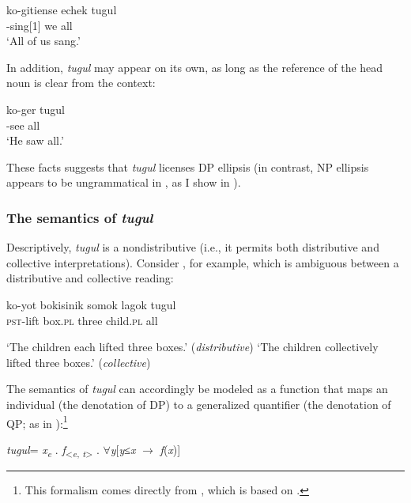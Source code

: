 \documentclass[output=paper,newtxmath,modfonts,nonflat,hidelinks]{langsci/langscibook}
\begin{document}
\ea \label{ex:landman:tugulpronoun}
    \gll ko-gitiense echek tugul\\ 
	     {\PST}-sing[1\PL] we all\\ 
    \glt ‘All of us sang.’
\z

 In addition, \textit{tugul} may appear on its own, as long as the reference of the head noun is clear from the context:

\ea \label{ex:landman:tugulonown}
    \gll ko-ger tugul\\ 
	     {\PST}-see all\\
    \glt ‘He saw all.’
\z 

These facts suggests that \textit{tugul} licenses DP ellipsis (in contrast, NP ellipsis appears to be ungrammatical in , as I show in ).

\subsubsection{The semantics of \textit{tugul}}\label{sec:landman:tugulsem}
Descriptively, \textit{tugul} is a nondistributive  (i.e., it permits both distributive and collective interpretations). Consider , for example, which is ambiguous between a distributive and collective reading:
 
\ea \label{ex:landman:distcoll}
    \gll ko-yot bokisinik somok lagok tugul\\
         \textsc{pst}-lift box.\textsc{pl} three child.\textsc{pl} all\\ 
    \glt 
      \begin{xlist}
      \ex \label{ex:landman:dist} ‘The children each lifted three boxes.’ (\textit{distributive})
      \ex \label{ex:landman:coll} ‘The children collectively lifted three boxes.’ (\textit{collective})
      \end{xlist}
\z

The semantics of \textit{tugul} can accordingly be modeled as a function that maps an individual (the denotation of DP) to a generalized quantifier (the denotation of QP; as in \citealt{Matthewson:2001}):\footnote{This formalism comes directly from \citet{Zimmermann:2014}, which is based on \citet{Matthewson:2001}.} 

\ea \label{ex:landman:tugulden}
\textlbrackdbl\textit{tugul}\textrbrackdbl = \textlambda\textit{x}\textsubscript{\textit{e}} .  \textlambda\textit{f}\textsubscript{<\textit{e}, \textit{t}>} . $\forall$\textit{y}[\textit{y}≤\textit{x} $\rightarrow$ \textit{f}(\textit{x})]
\z
\end{document}
